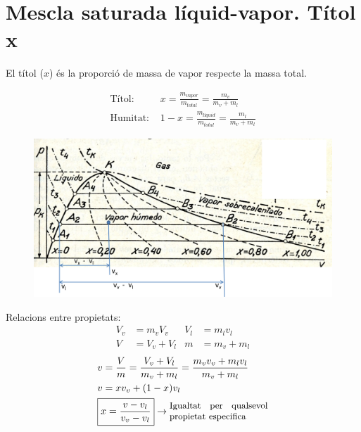 \documentclass[a4paper]{article}
\begin{document}
\section{Mescla saturada líquid-vapor. Títol x}

El títol ($x$) és la proporció de massa de vapor respecte la massa total.

\begin{align*}
	\text{Títol: } &x = \frac{m_{vapor}}{m_{total}} = \frac{m_{v}}{m_v + m_l} \\
	\text{Humitat: } &1 - x = \frac{m_{líquid}}{m_{total}} = \frac{m_l}{m_v + m_l}
\end{align*}

\begin{figure}[H]
	\centering
	\includegraphics[width=\textwidth]{titol_vapor}
\end{figure}

Relacions entre propietats:
\begin{align*}
	V_v &= m_v V_v & V_l &= m_l v_l \\
	V &= V_v + V_l & m &= m_v + m_l
\end{align*}
\begin{align*}
	& v = \frac{V}{m} = \frac{V_v + V_l}{m_v + m_l} = \frac{m_v v_v + m_l v_l}{m_v + m_l}\\
	& v = x v_v + (1 - x) v_l \\
	& \boxed{x = \frac{v - v_l}{v_v - v_l}} \rightarrow \parbox{10em}{\small Igualtat per qualsevol propietat especifica}
\end{align*}
\end{document}
